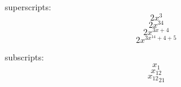 \documentclass[11]{article}
\begin{document}
superscripts: 
$$ 2x^3 $$ %
$$ 2x^{34} $$ %
$$ 2x^{ 3x + 4} $$
$$ 2x^{ 3x^{14} + 4 + 5} $$ %

subscripts: 
$$ x_1 $$
$$ x_{12} $$
$$ {x_{12}}_{21} $$ %
\end{document}
